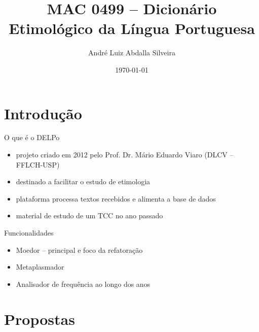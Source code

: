\documentclass[aspectratio=43,display]{beamer}
\title[DELPo]{MAC 0499 -- Dicionário Etimológico da Língua Portuguesa}
\author{André Luiz Abdalla Silveira}
\institute{Instituto de Matemática e Estatística \\ Universidade de São Paulo}
\date{\today}
\begin{document}
  \begin{frame}
    \maketitle
  \end{frame}

  \begin{frame}
    \tableofcontents
  \end{frame}

  \section{Introdução}\label{sec:introducao}

  \begin{frame}
    \tableofcontents[currentsection]
  \end{frame}

  \begin{frame}{O que é o DELPo}
    \begin{itemize}
      \item projeto criado em 2012 pelo Prof. Dr. Mário Eduardo Viaro (DLCV -- FFLCH-USP) \pause
      \item destinado a facilitar o estudo de etimologia \pause
      \item plataforma processa textos recebidos e alimenta a base de dados \pause
      \item material de estudo de um TCC no ano passado
    \end{itemize}
  \end{frame}

  \begin{frame}{Funcionalidades}
    \begin{itemize}
      \pause
      \item Moedor -- principal e foco da refatoração \pause
      \item Metaplasmador \pause
      \item Analisador de frequência ao longo dos anos
    \end{itemize}
  \end{frame}

  \section{Propostas}\label{sec:propostas}
\end{document}
